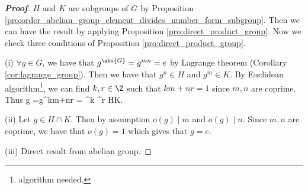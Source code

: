 \begin{proof}[\bf Proof]
$H$ and $K$ are subgroups of $G$ by Proposition \ref{pro:order_abelian_group_element_divides_number_form_subgroup}. Then we can have the result by applying Proposition \ref{pro:direct_product_group}.  Now we check three conditions of Proposition \ref{pro:direct_product_group}.
\ben
\item [(i)] $\forall g\in G$, we have that $g^{\abs{G}} = g^{mn} = e$ by Lagrange theorem (Corollary \ref{cor:lagrange_group}). Then we have that $g^n \in H$ and $g^m \in K$. By Euclidean algorithm\footnote{algorithm needed.}, we can find $k,r \in \Z$ such that $km + nr = 1$ since $m,n$ are coprime. Thus
\be
g =g^{km+nr} = ^k ^r \in HK.
\ee


\item [(ii)] Let $g\in H\cap K$. Then by assumption $o(g)\mid m$ and $o(g) \mid n$. Since $m,n$ are coprime, we have that $o(g) = 1$ which gives that $g=e$.

\item [(iii)] Direct result from abelian group.
\een
\end{proof}









